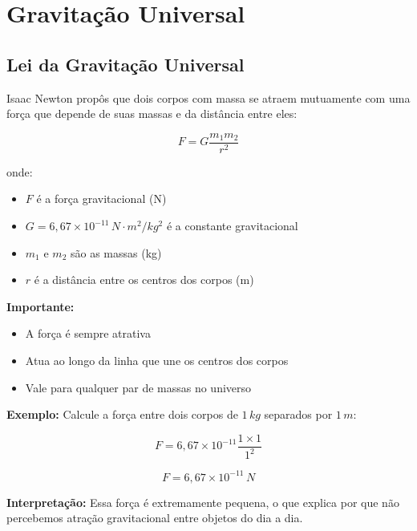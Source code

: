\documentclass[a4paper,12pt]{article}
\begin{document}
\newpage
\section{Gravitação Universal}

\subsection{Lei da Gravitação Universal}

Isaac Newton propôs que dois corpos com massa se atraem mutuamente com uma força que depende de suas massas e da distância entre eles:

\[
F = G \frac{m_1 m_2}{r^2}
\]

onde:
\begin{itemize}
    \item $F$ é a força gravitacional (N)
    \item $G = 6{,}67 \times 10^{-11}\,N \cdot m^2/kg^2$ é a constante gravitacional
    \item $m_1$ e $m_2$ são as massas (kg)
    \item $r$ é a distância entre os centros dos corpos (m)
\end{itemize}

\textbf{Importante:}
\begin{itemize}
    \item A força é sempre atrativa
    \item Atua ao longo da linha que une os centros dos corpos
    \item Vale para qualquer par de massas no universo
\end{itemize}

\textbf{Exemplo:} Calcule a força entre dois corpos de $1\,kg$ separados por $1\,m$:

\[
F = 6{,}67 \times 10^{-11} \frac{1 \times 1}{1^2}
\]

\[
F = 6{,}67 \times 10^{-11}\,N
\]

\textbf{Interpretação:}  
Essa força é extremamente pequena, o que explica por que não percebemos atração gravitacional entre objetos do dia a dia.
\end{document}
